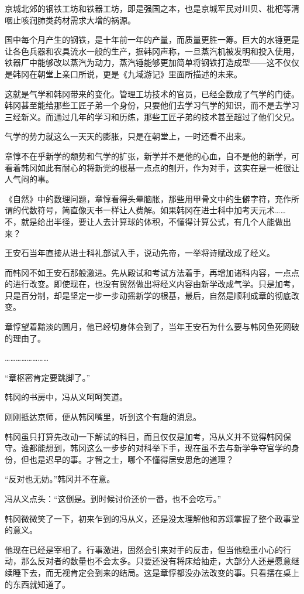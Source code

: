 京城北郊的钢铁工坊和铁器工坊，即是强国之本，也是京城军民对川贝、枇杷等清咽止咳润肺类药材需求大增的祸源。

国中每个月产生的钢铁，是十年前一年的产量，而质量更胜一筹。巨大的水锤更是让各色兵器和农具流水一般的生产，据韩冈声称，一旦蒸汽机被发明和投入使用，铁器厂中能够改以蒸汽为动力，蒸汽锤能够更加简单将钢铁打造成型——这不仅仅是韩冈在朝堂上亲口所说，更是《九域游记》里面所描述的未来。

这就是气学和韩冈带来的变化。管理工坊技术的官员，已经全数成了气学的门徒。韩冈甚至能给那些工匠子弟一个身份，只要他们去学习气学的知识，而不是去学习三经新义。而通过几年的学习和历练，那些工匠子弟的技术甚至超过了他们父兄。

气学的势力就这么一天天的膨胀，只是在朝堂上，一时还看不出来。

章惇不在乎新学的颓势和气学的扩张，新学并不是他的心血，自不是他的新学，可看着韩冈如此有耐心的将新党的根基一点点的刨开，作为对手，这实在是一桩很让人气闷的事。

《自然》中的数理问题，章惇看得头晕脑胀，那些用甲骨文中的生僻字符，充作所谓的代数符号，简直像天书一样让人费解。如果韩冈在进士科中加考天元术……不，就是给出半径，要让人去计算球的体积，不懂得计算公式，有几个人能做出来？

王安石当年直接从进士科礼部试入手，说动先帝，一举将诗赋改成了经义。

而韩冈不如王安石那般激进。先从殿试和考试方法着手，再增加诸科内容，一点点的进行改变。即使现在，也没有贸然做出将经义内容由新学改成气学。只是加考，只是百分制，却是坚定一步一步动摇新学的根基，最后，自然是顺利成章的彻底改变。

章惇望着黯淡的圆月，他已经切身体会到了，当年王安石为什么要与韩冈鱼死网破的理由了。

……………………

“章枢密肯定要跳脚了。”

韩冈的书房中，冯从义呵呵笑道。

刚刚抵达京师，便从韩冈嘴里，听到这个有趣的消息。

韩冈虽只打算先改动一下解试的科目，而且仅仅是加考，冯从义并不觉得韩冈保守。谁都能想到，韩冈这么一步步的对科举下手，现在虽不去与新学争夺官学的身份，但也是迟早的事。才智之士，哪个不懂得居安思危的道理？

“反对也无妨。”韩冈并不在意。

冯从义点头：“这倒是。到时候讨价还价一番，也不会吃亏。”

韩冈微微笑了一下，初来乍到的冯从义，还是没太理解他和苏颂掌握了整个政事堂的意义。

他现在已经是宰相了。行事激进，固然会引来对手的反击，但当他稳重小心的行动，那么反对者的数量也不会太多。只要还没有将床给抽走，大部分人还是愿意继续睡下去，而无视肯定会到来的结局。这是章惇都没办法改变的事。只看摆在桌上的东西就知道了。

